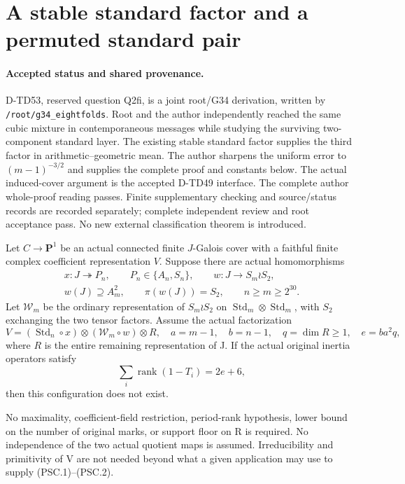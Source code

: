 \section{A stable standard factor and a permuted standard pair}
\label{sec:permuted-standard-pair-cube}

\paragraph{Accepted status and shared provenance.}
D-TD53, reserved question Q2fi, is a joint root/G34 derivation,
written by \texttt{/root/g34\_eightfolds}.  Root and the author
independently reached the same cubic mixture in contemporaneous
messages while studying the surviving two-component standard layer.
The existing stable standard factor supplies the third factor in
arithmetic--geometric mean.  The author sharpens the uniform error
to \((m-1)^{-3/2}\) and supplies the complete proof and constants
below.  The actual induced-cover argument is the accepted D-TD49
interface.  The complete author whole-proof reading passes.
Finite supplementary checking and source/status records are recorded
separately; complete independent review and root acceptance pass.
No new external classification theorem is introduced.

\begin{theorem}[D-TD53]
Let \(C\to\mathbf P^1\) be an actual connected finite
\(J\)-Galois cover with a faithful finite complex coefficient
representation \(V\).  Suppose there are actual homomorphisms
\[
 \begin{gathered}
 x:J\twoheadrightarrow P_n,\qquad P_n\in\{A_n,S_n\},\qquad
 w:J\longrightarrow S_m\wr S_2,\\
 w(J)\supseteq A_m^2,\qquad
 \pi(w(J))=S_2,\qquad n\ge m\ge2^{30}.
 \end{gathered}
 \tag{PSC.1}
\]
Let \(\mathcal W_m\) be the ordinary representation of
\(S_m\wr S_2\) on
\(\operatorname{Std}_m\otimes\operatorname{Std}_m\), with
\(S_2\) exchanging the two tensor factors.  Assume the actual
factorization
\[
 V=(\operatorname{Std}_n\circ x)\otimes
                      (\mathcal W_m\circ w)\otimes R,
 \quad a=m-1,\quad b=n-1,\quad q=\dim R\ge1,
 \quad e=ba^2q,
 \tag{PSC.2}
\]
where \(R\) is the entire remaining representation of J.
If the actual original inertia operators satisfy
\[
                   \sum_i\operatorname{rank}(1-T_i)=2e+6,
 \tag{PSC.3}
\]
then this configuration does not exist.

No maximality, coefficient-field restriction, period-rank
hypothesis, lower bound on the number of original marks, or
support floor on R is required.  No independence of the two
actual quotient maps is assumed.  Irreducibility and primitivity
of V are not needed beyond what a given application may use to
supply (PSC.1)--(PSC.2).
\end{theorem}

